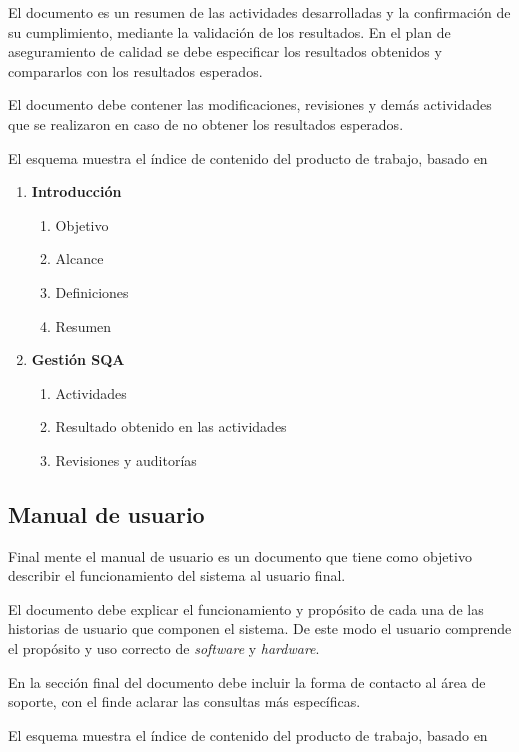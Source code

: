 El documento es un resumen de las actividades desarrolladas y la confirmación de su cumplimiento, mediante la validación de los resultados. En el plan de aseguramiento de calidad se debe especificar los resultados obtenidos y compararlos con los resultados esperados.

El documento debe contener las modificaciones, revisiones y demás actividades que se realizaron en caso de no obtener los resultados esperados.

El esquema muestra el índice de contenido del producto de trabajo, basado en \citep{mem00}

\begin{framed}
    \begin{enumerate}
		\item \textbf{Introducción}
		\begin{enumerate}
			\item Objetivo
			\item Alcance
			\item Definiciones
			\item Resumen
		\end{enumerate}
		\item \textbf{Gestión SQA}
		\begin{enumerate}
			\item Actividades
			\item Resultado obtenido en las actividades
			\item Revisiones y auditorías
		\end{enumerate}
	\end{enumerate}
\end{framed}

\subsection{Manual de usuario}
Final mente el manual de usuario es un documento que tiene como objetivo describir el funcionamiento del sistema al usuario final. 

El documento debe explicar el funcionamiento y propósito de cada una de las historias de usuario que componen el sistema. De este modo el usuario comprende el propósito y uso correcto de \emph{software} y \emph{hardware}.

En la sección final del documento debe incluir la forma de contacto al área de soporte, con el finde aclarar las consultas más específicas.

El esquema muestra el índice de contenido del producto de trabajo, basado en \citep{mem00}

